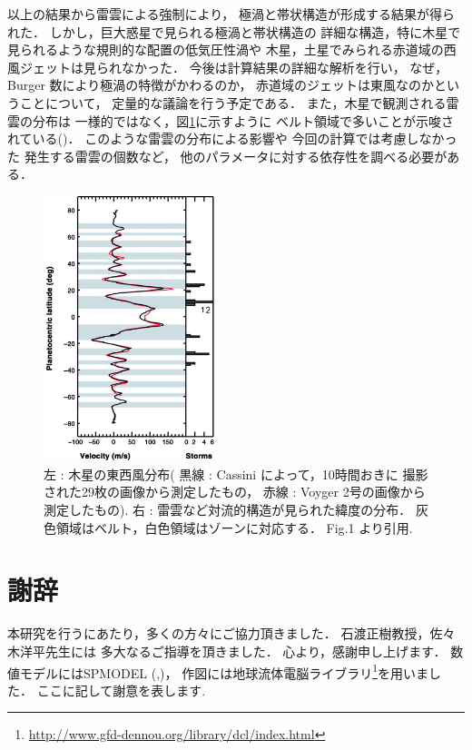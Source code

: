 \documentclass[a4j,12pt,openbib,oneside]{jreport}
\newcounter{chapcounter}
\newcounter{seccounter}
\begin{document}
以上の結果から雷雲による強制により，
極渦と帯状構造が形成する結果が得られた．
しかし，巨大惑星で見られる極渦と帯状構造の
詳細な構造，特に木星で見られるような規則的な配置の低気圧性渦や
木星，土星でみられる赤道域の西風ジェットは見られなかった．
%
今後は計算結果の詳細な解析を行い，
なぜ，Burger 数により極渦の特徴がかわるのか，
赤道域のジェットは東風なのかということについて，
定量的な議論を行う予定である．
%
また，木星で観測される雷雲の分布は
一様的ではなく，図\ref{fig:thunderstorm}に示すように
ベルト領域で多いことが示唆されている(\cite{Porco2003})．
このような雷雲の分布による影響や
今回の計算では考慮しなかった
発生する雷雲の個数など，
他のパラメータに対する依存性を調べる必要がある．
\vspace{1zh}
\begin{figure}[ht]
  \begin{center}
    \includegraphics[clip,width=5cm]{./fig/conclusion/thunderstorm.jpg}
    \caption{
      \footnotesize{左 : 木星の東西風分布(
黒線 : Cassini によって，10時間おきに
撮影された29枚の画像から測定したもの，
赤線 : Voyger 2号の画像から測定したもの\citep{Limaye1986}).
右 : 雷雲など対流的構造が見られた緯度の分布．
灰色領域はベルト，白色領域はゾーンに対応する．
\cite{Porco2003} Fig.1 より引用.
      }
    }
    \label{fig:thunderstorm}
  \end{center}
\end{figure}
%
\def\acknow{謝辞}
\chapter*{\acknow}
\addcontentsline{toc}{chapter}{\acknow}
\label{acknow}
本研究を行うにあたり，多くの方々にご協力頂きました．
石渡正樹教授，佐々木洋平先生には
多大なるご指導を頂きました．
心より，感謝申し上げます．
数値モデルにはSPMODEL (\cite{spmodel2006},\cite{spmodel2013})，
作図には地球流体電脳ライブラリ\footnote{\url{http://www.gfd-dennou.org/library/dcl/index.html}}を用いました．
ここに記して謝意を表します.
%
%
\end{document}
